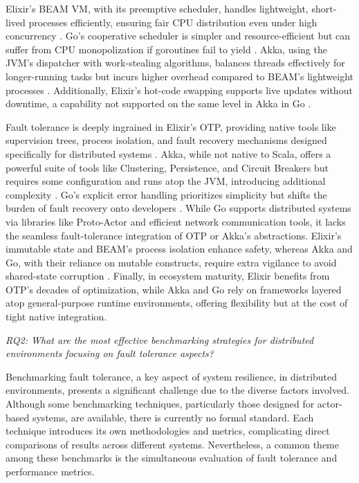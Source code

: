Elixir’s BEAM VM, with its preemptive scheduler, handles lightweight, short-lived processes efficiently, ensuring fair CPU distribution even under high concurrency \cite{elixir-docs-hexdocs}. Go’s cooperative scheduler is simpler and resource-efficient but can suffer from CPU monopolization if goroutines fail to yield \cite{go-docs}. Akka, using the JVM’s dispatcher with work-stealing algorithms, balances threads effectively for longer-running tasks but incurs higher overhead compared to BEAM’s lightweight processes \cite{akka-docs}. Additionally, Elixir’s hot-code swapping supports live updates without downtime, a capability not supported on the same level in Akka in Go \cite{Juric2024}.

Fault tolerance is deeply ingrained in Elixir’s OTP, providing native tools like supervision trees, process isolation, and fault recovery mechanisms designed specifically for distributed systems \cite{elixir-docs-hexdocs}. Akka, while not native to Scala, offers a powerful suite of tools like Clustering, Persistence, and Circuit Breakers but requires some configuration and runs atop the JVM, introducing additional complexity \cite{akka-docs}. Go’s explicit error handling prioritizes simplicity but shifts the burden of fault recovery onto developers \cite{go-docs}. While Go supports distributed systems via libraries like Proto-Actor and efficient network communication tools, it lacks the seamless fault-tolerance integration of OTP or Akka’s abstractions. Elixir’s immutable state and BEAM’s process isolation enhance safety, whereas Akka and Go, with their reliance on mutable constructs, require extra vigilance to avoid shared-state corruption \cite{go-docs,akka-docs}. Finally, in ecosystem maturity, Elixir benefits from OTP’s decades of optimization, while Akka and Go rely on frameworks layered atop general-purpose runtime environments, offering flexibility but at the cost of tight native integration.

\textit{RQ2: What are the most effective benchmarking strategies for distributed environments focusing on fault tolerance aspects?}

Benchmarking fault tolerance, a key aspect of system resilience, in distributed environments, presents a significant challenge due to the diverse factors involved. Although some benchmarking techniques, particularly those designed for actor-based systems, are available, there is currently no formal standard. Each technique introduces its own methodologies and metrics, complicating direct comparisons of results across different systems. Nevertheless, a common theme among these benchmarks is the simultaneous evaluation of fault tolerance and performance metrics.


